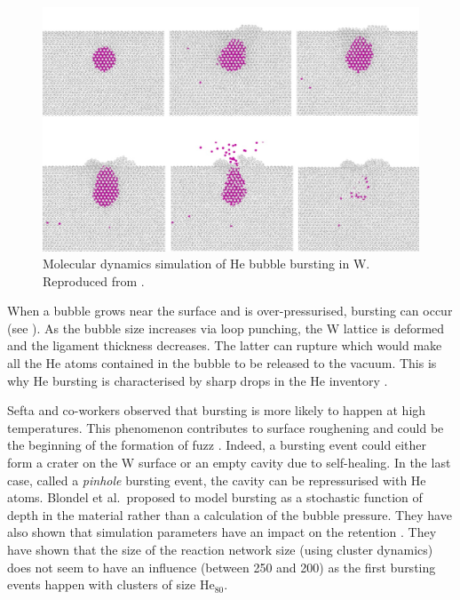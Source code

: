 \begin{figure} [h!]
    \centering
    \includegraphics[width=\linewidth]{Figures/Chapter1/bubble_bursting_zhou.jpg}
    \caption{Molecular dynamics simulation of He bubble bursting in W. Reproduced from \cite{zhou_growth_2019}.}
\end{figure}

When a bubble grows near the surface and is over-pressurised, \gls{bursting} can occur (see ).
As the bubble size increases via \gls{loop punching}, the \gls{W} \gls{lattice} is deformed and the ligament thickness decreases.
The latter can rupture which would make all the \gls{He} atoms contained in the bubble to be released to the vacuum.
This is why \gls{He} \gls{bursting} is characterised by sharp drops in the \gls{He} \gls{inventory} .

Sefta and co-workers observed that \gls{bursting} is more likely to happen at high temperatures.
This phenomenon contributes to surface roughening and could be the beginning of the formation of \gls{fuzz} .
Indeed, a \gls{bursting} event could either form a crater on the \gls{W} surface or an empty cavity due to self-healing.
In the last case, called a \textit{pinhole} \gls{bursting} event, the cavity can be repressurised with \gls{He} atoms.
Blondel et al.\ proposed to model \gls{bursting} as a stochastic function of depth in the material rather than a calculation of the bubble pressure.
They have also shown that simulation parameters have an impact on the \gls{retention} .
They have shown that the size of the reaction network size (using cluster dynamics) does not seem to have an influence (between 250 and 200) as the first bursting events happen with clusters of size $\text{He}_{80}$.

